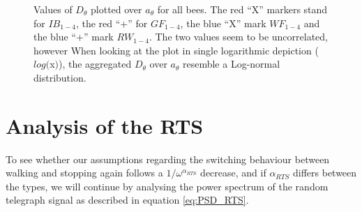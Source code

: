 
\begin{figure}%
    \centering
    \caption{Values of $D_{\theta}$ plotted over $a_{\theta}$ for all bees. The red ``X'' markers stand for $IB_{1-4}$, the red ``+'' for $GF_{1-4}$, the blue ``X'' mark $WF_{1-4}$ and the blue ``+'' mark $RW_{1-4}$. The two values seem to be uncorrelated, however When looking at the plot in single logarithmic depiction ($log($x$)$), the aggregated $D_{\theta}$ over $a_{\theta}$ resemble a Log-normal distribution.}
    \label{fig:D_vs_a_theta}
\end{figure}

\newpage

\section{Analysis of the RTS}


To see whether our assumptions regarding the switching behaviour between walking and stopping again follows a $1/\omega^{\alpha_{RTS}}$ decrease, and if $\alpha_{RTS}$ differs between the types, we will continue by analysing the power spectrum of the random telegraph signal as described in equation \ref{eq:PSD_RTS}.

